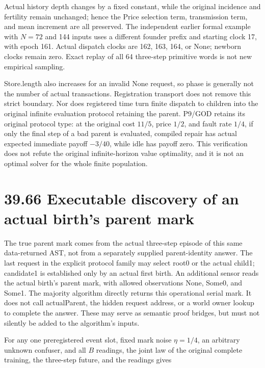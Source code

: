 \documentclass[
  english,
  11pt,
  oneside]{book}
\begin{document}
Actual history depth changes by a fixed constant, while the original incidence and fertility remain unchanged; hence the Price selection term, transmission term, and mean increment are all preserved. The independent earlier formal example with \(N=72\) and 144 inputs uses a different founder prefix and starting clock 17, with epoch 161. Actual dispatch clocks are 162, 163, 164, or None; newborn clocks remain zero. Exact replay of all 64 three-step primitive words is not new empirical sampling.

Store.length also increases for an invalid None request, so phase is generally not the number of actual transactions. Registration transport does not remove this strict boundary. Nor does registered time turn finite dispatch to children into the original infinite evaluation protocol retaining the parent. P9/GOD retains its original protocol type: at the original cost \(11/5\), price \(1/2\), and fault rate \(1/4\), if only the final step of a bad parent is evaluated, compiled repair has actual expected immediate payoff \(-3/40\), while idle has payoff zero. This verification does not refute the original infinite-horizon value optimality, and it is not an optimal solver for the whole finite population.

\section{39.66 Executable discovery of an actual birth's parent mark}\label{executable-discovery-of-an-actual-births-parent-mark}

The true parent mark comes from the actual three-step episode of this same data-returned AST, not from a separately supplied parent-identity answer. The last request in the explicit protocol family may select root0 or the actual child1; candidate1 is established only by an actual first birth. An additional sensor reads the actual birth's parent mark, with allowed observations None, Some0, and Some1. The majority algorithm directly returns this operational serial mark. It does not call actualParent, the hidden request address, or a world owner lookup to complete the answer. These may serve as semantic proof bridges, but must not silently be added to the algorithm's inputs.

For any one preregistered event slot, fixed mark noise \(\eta=1/4\), an arbitrary unknown confuser, and all \(B\) readings, the joint law of the original complete training, the three-step future, and the readings gives
\end{document}
